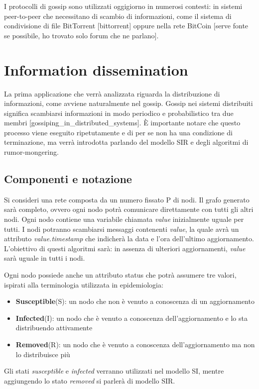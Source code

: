 I protocolli di gossip sono utilizzati oggigiorno in numerosi contesti: in sistemi peer-to-peer che necessitano di scambio di informazioni, come il sistema di condivisione di file BitTorrent [bittorrent] oppure nella rete BitCoin [serve fonte se possibile, ho trovato solo forum che ne parlano].

\section{Information dissemination}
La prima applicazione che verrà analizzata riguarda la distribuzione di informazioni, come avviene naturalmente nel gossip. Gossip nei sistemi distribuiti significa scambiarsi informazioni in modo periodico e probabilistico tra due membri [gossiping\_in\_distributed\_systems]. È importante notare che questo processo viene eseguito ripetutamente e di per se non ha una condizione di terminazione, ma verrà introdotta parlando del modello SIR e degli algoritmi di rumor-mongering.
\subsection{Componenti e notazione}
Si consideri una rete composta da un numero fissato P di nodi. Il grafo generato sarà completo, ovvero ogni nodo potrà comunicare direttamente con tutti gli altri nodi. Ogni nodo contiene una variabile chiamata \textit{value} inizialmente uguale per tutti. I nodi potranno scambiarsi messaggi contenenti \textit{value}, la quale avrà un attributo \textit{value.timestamp} che indicherà la data e l'ora dell'ultimo aggiornamento. L'obiettivo di questi algoritmi sarà: in assenza di ulteriori aggiornamenti, \textit{value} sarà uguale in tutti i nodi.

Ogni nodo possiede anche un attributo status che potrà assumere tre valori, ispirati alla terminologia utilizzata in epidemiologia:
\begin{itemize}
    \item \textbf{Susceptible}(S): un nodo che non è venuto a conoscenza di un aggiornamento
    \item \textbf{Infected}(I): un nodo che è venuto a conoscenza dell'aggiornamento e lo sta distribuendo attivamente
    \item \textbf{Removed}(R): un nodo che è venuto a conoscenza dell'aggiornamento ma non lo distribuisce più
\end{itemize}
Gli stati \textit{susceptible} e \textit{infected} verranno utilizzati nel modello SI, mentre aggiungendo lo stato \textit{removed} si parlerà di modello SIR.
